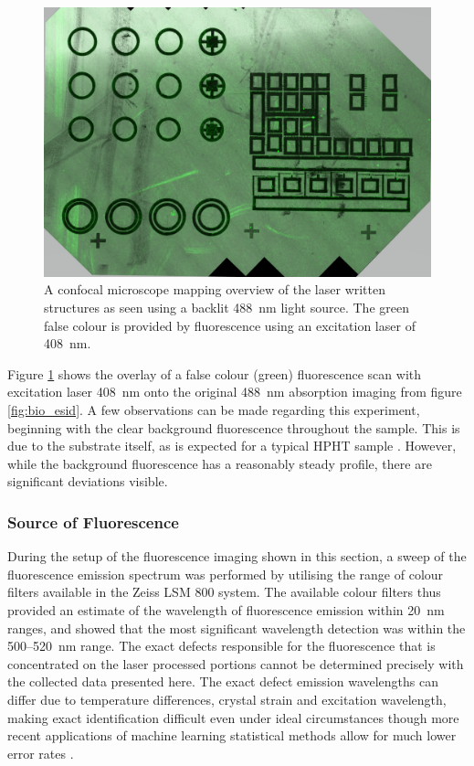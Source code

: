 \begin{refsection}
\begin{figure}[H]
    \centering
    \includegraphics[width=\textwidth]{Chapter7/Figs/Raster/FL_overview.jpg}
    \caption{A confocal microscope mapping overview of the laser written structures as seen using a backlit 488~\si{\nano\metre} light source. The green false colour is provided by fluorescence using an excitation laser of 408~\si{\nano\metre}.}
    \label{fig:fl_overview}
\end{figure}

Figure \ref{fig:fl_overview} shows the overlay of a false colour (green) fluorescence scan with excitation laser 408~\si{\nano\metre} onto the original 488~\si{\nano\metre} absorption imaging from figure \ref{fig:bio_esid}. A few observations can be made regarding this experiment, beginning with the clear background fluorescence throughout the sample. This is due to the substrate itself, as is expected for a typical HPHT sample \cite{eaton2017, zhao2023}. However, while the background fluorescence has a reasonably steady profile, there are significant deviations visible. 

\subsubsection{Source of Fluorescence}
\label{subsubsec:source_of_fluorescence}
During the setup of the fluorescence imaging shown in this section, a sweep of the fluorescence emission spectrum was performed by utilising the range of colour filters available in the Zeiss LSM 800 system. The available colour filters thus provided an estimate of the wavelength of fluorescence emission within 20~\si{\nano\metre} ranges, and showed that the most significant wavelength detection was within the 500--520~\si{\nano\metre} range. The exact defects responsible for the fluorescence that is concentrated on the laser processed portions cannot be determined precisely with the collected data presented here. The exact defect emission wavelengths can differ due to temperature differences, crystal strain and excitation wavelength, making exact identification difficult even under ideal circumstances \cite{Jones2020} though more recent applications of machine learning statistical methods allow for much lower error rates \cite{Hardman2022}. 


\end{refsection}
